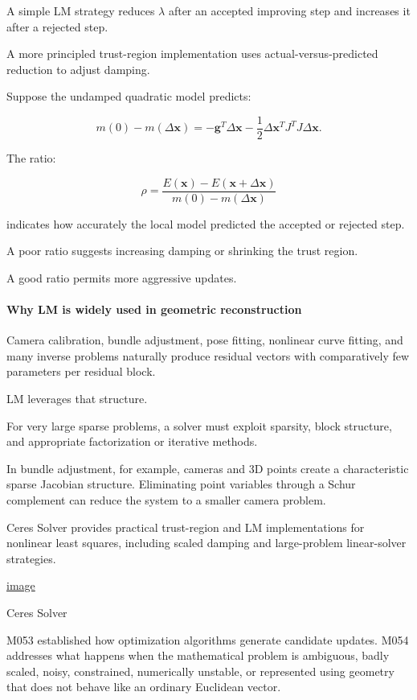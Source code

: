 A simple LM strategy reduces \(\lambda\) after an accepted improving step and increases it after a rejected step.

A more principled trust-region implementation uses actual-versus-predicted reduction to adjust damping.

Suppose the undamped quadratic model predicts:

\[
m(0)-m(\Delta\mathbf x) = -\mathbf g^T\Delta\mathbf x -\frac12\Delta\mathbf x^TJ^TJ\Delta\mathbf x.
\]

The ratio:

\[
\rho= \frac{ E(\mathbf x)-E(\mathbf x+\Delta\mathbf x) }{ m(0)-m(\Delta\mathbf x) }
\]

indicates how accurately the local model predicted the accepted or rejected step.

A poor ratio suggests increasing damping or shrinking the trust region.

A good ratio permits more aggressive updates.

\paragraph{Why LM is widely used in geometric reconstruction}\label{02-foundations-ii-ch027-why-lm-is-widely-used-in-geometric-reconstruction}

Camera calibration, bundle adjustment, pose fitting, nonlinear curve fitting, and many inverse problems naturally produce residual vectors with comparatively few parameters per residual block.

LM leverages that structure.

For very large sparse problems, a solver must exploit sparsity, block structure, and appropriate factorization or iterative methods.

In bundle adjustment, for example, cameras and 3D points create a characteristic sparse Jacobian structure. Eliminating point variables through a Schur complement can reduce the system to a smaller camera problem.

Ceres Solver provides practical trust-region and LM implementations for nonlinear least squares, including scaled damping and large-problem linear-solver strategies. 

\href{https://www.google.com/s2/favicons?domain=https://ceres-solver.readthedocs.io&sz=32}{image}

Ceres Solver

M053 established how optimization algorithms generate candidate updates. M054 addresses what happens when the mathematical problem is ambiguous, badly scaled, noisy, constrained, numerically unstable, or represented using geometry that does not behave like an ordinary Euclidean vector.

